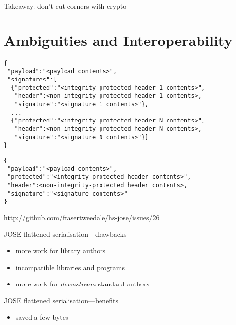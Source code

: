 \documentclass[ignorenonframetext,aspectratio=43]{beamer}
\providecommand{\tightlist}{%
  \setlength{\itemsep}{0pt}\setlength{\parskip}{0pt}}
\begin{document}
\begin{frame}[plain]
\huge
Takeaway: don't cut corners with crypto
\end{frame}




\section{Ambiguities and Interoperability}

\begin{frame}[fragile]
\begin{verbatim}
{
 "payload":"<payload contents>",
 "signatures":[
  {"protected":"<integrity-protected header 1 contents>",
   "header":<non-integrity-protected header 1 contents>,
   "signature":"<signature 1 contents>"},
  ...
  {"protected":"<integrity-protected header N contents>",
   "header":<non-integrity-protected header N contents>,
   "signature":"<signature N contents>"}]
}
\end{verbatim}
\end{frame}

\begin{frame}[fragile]
\begin{verbatim}
{
 "payload":"<payload contents>",
 "protected":"<integrity-protected header contents>",
 "header":<non-integrity-protected header contents>,
 "signature":"<signature contents>"
}
\end{verbatim}
\end{frame}

\begin{frame}[plain]
\begin{center}
\end{center}
\tiny \url{http://github.com/frasertweedale/hs-jose/issues/26}
\end{frame}

\begin{frame}{JOSE flattened serialisation---drawbacks}
\begin{itemize}
\tightlist
\item more work for library authors
\item incompatible libraries and programs
\item more work for {\em downstream} standard authors
\end{itemize}
\end{frame}

\begin{frame}{JOSE flattened serialisation---benefits}
\begin{itemize}
\tightlist
\item saved a few bytes
\end{itemize}
\end{frame}
\end{document}
